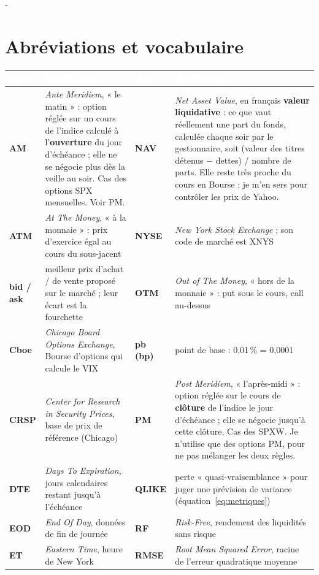 \documentclass[10pt,a4paper]{article}
\makeatletter
\newcommand{\entete}[1]{\textcolor{white}{\bfseries #1}}
\newcommand{\besoin}[1]{\par\penalty-100\begingroup\setlength{\dimen@}{#1}%
  \dimen@ii\pagegoal\advance\dimen@ii-\pagetotal
  \ifdim\dimen@>\dimen@ii\ifdim\dimen@ii>\z@\vfil\fi\break\fi\endgroup}
\let\sectionorigine\section
\renewcommand{\section}{\besoin{6\baselineskip}\sectionorigine}
\makeatother
\begin{document}
\section{Abréviations et vocabulaire}\label{sec:abreviations}
{\small
\begin{longtable}{@{}>{\leavevmode\bfseries\color{marine}}L{1.75cm} L{6.6cm} >{\leavevmode\bfseries\color{marine}}L{1.75cm} L{6.6cm}@{}}
\entete{Sigle} & \entete{Signification} & \entete{Sigle} & \entete{Signification} \\
\endhead
AM & \emph{Ante Meridiem}, « le matin » : option réglée sur un cours de l'indice calculé à l'\textbf{ouverture} du jour d'échéance ; elle ne se négocie plus dès la veille au soir. Cas des options SPX mensuelles. Voir PM. & NAV & \emph{Net Asset Value}, en français \textbf{valeur liquidative} : ce que vaut réellement une part du fonds, calculée chaque soir par le gestionnaire, soit (valeur des titres détenus − dettes) / nombre de parts. Elle reste très proche du cours en Bourse ; je m'en sers pour contrôler les prix de Yahoo. \\
ATM & \emph{At The Money}, « à la monnaie » : prix d'exercice égal au cours du sous-jacent & NYSE & \emph{New York Stock Exchange} ; son code de marché est XNYS \\
bid / ask & meilleur prix d'achat / de vente proposé sur le marché ; leur écart est la fourchette & OTM & \emph{Out of The Money}, « hors de la monnaie » : put sous le cours, call au-dessus \\
Cboe & \emph{Chicago Board Options Exchange}, Bourse d'options qui calcule le VIX & pb (bp) & point de base : 0,01\,\% = 0,0001 \\
CRSP & \emph{Center for Research in Security Prices}, base de prix de référence (Chicago) & PM & \emph{Post Meridiem}, « l'après-midi » : option réglée sur le cours de \textbf{clôture} de l'indice le jour d'échéance ; elle se négocie jusqu'à cette clôture. Cas des SPXW. Je n'utilise que des options PM, pour ne pas mélanger les deux règles. \\
DTE & \emph{Days To Expiration}, jours calendaires restant jusqu'à l'échéance & QLIKE & perte « quasi-vraisemblance » pour juger une prévision de variance (équation~\ref{eq:metriques}) \\
EOD & \emph{End Of Day}, données de fin de journée & RF & \emph{Risk-Free}, rendement des liquidités sans risque \\
ET & \emph{Eastern Time}, heure de New York & RMSE & \emph{Root Mean Squared Error}, racine de l'erreur quadratique moyenne \\

\end{longtable}}
\end{document}
